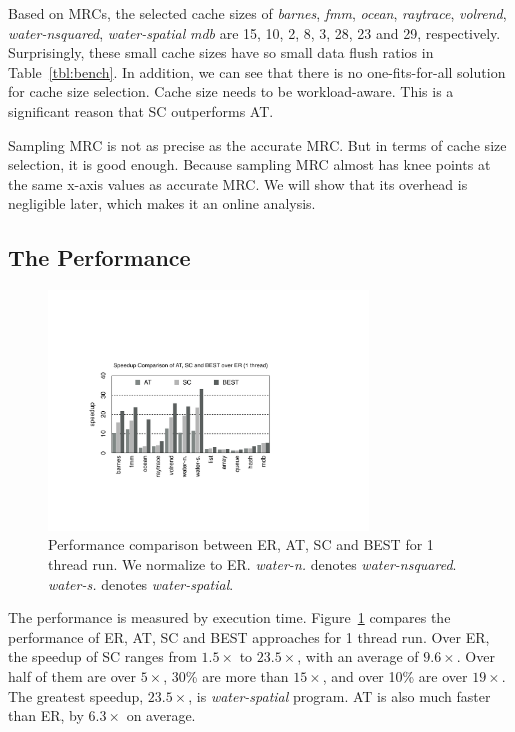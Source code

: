 \documentclass[preprint,nocopyrightspace,10pt]{sigplanconf}
\begin{document}
Based on MRCs, the selected cache sizes of \emph{barnes}, \emph{fmm}, \emph{ocean}, 
\emph{raytrace}, \emph{volrend}, \emph{water-nsquared}, \emph{water-spatial}
\emph{mdb} are 15, 10, 2, 8, 3, 28, 23 and 29, respectively. Surprisingly, these small
cache sizes have so small data flush ratios in Table~\ref{tbl:bench}. In addition, we can
see that there is no one-fits-for-all solution for cache size selection. Cache size needs to be
workload-aware. This is a significant reason that SC outperforms AT.

Sampling MRC is not as precise as the accurate MRC. But in terms of cache 
size selection, it is good enough. Because sampling MRC almost has knee points 
at the same x-axis values as accurate MRC. We will show that its overhead is negligible later,
which makes it an online analysis.

\subsection{The Performance}

\begin{figure}[hbpt]
\centering
\includegraphics[width=8.5cm]{figures/perf_comp1.pdf}
\caption{Performance comparison between ER, AT, SC and BEST for
1 thread run. We normalize to ER. \emph{water-n.} denotes \emph{water-nsquared}.
 \emph{water-s.} denotes \emph{water-spatial}. }
\label{fig:perf1}
\end{figure}

The performance is measured by execution time. Figure~\ref{fig:perf1} compares
the performance of ER, AT, SC and BEST approaches for 1 thread run. 
Over ER, the speedup of SC ranges from $1.5\times$ to $23.5\times$, with an average of $9.6\times$. 
Over half of them are over $5\times$, 30\% are more than $15\times$, and 
over 10\% are over $19\times$. The greatest speedup, $23.5\times$, is \emph{water-spatial} 
program. AT is also much faster than ER, by $6.3\times$ on average.
\end{document}
